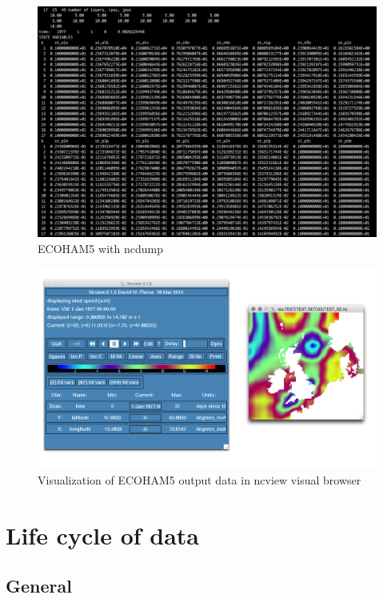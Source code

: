 \documentclass[]{article}
\begin{document}
\break

\begin{figure}[h!]
    \centering
    \includegraphics{pics/ncdumpecoham.png}
    \caption{ECOHAM5 with ncdump}
\end{figure}

\begin{figure}[h!]
    \centering
    \includegraphics{pics/ncviewecoham.png}
    \caption{Visualization of ECOHAM5 output data in ncview visual browser}
\end{figure}

\section{Life cycle of data}\label{life-cycle-of-data}

\subsection{General}\label{general}
\end{document}
